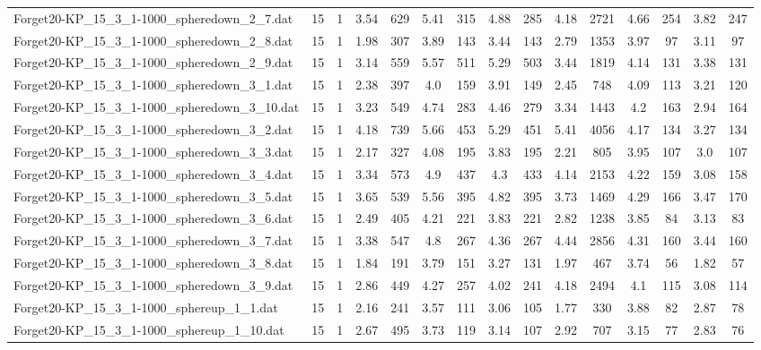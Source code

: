 \begin{table}[!ht]
{\begin{tabular}{lcccccccccccccc}
Forget20-KP\_15\_3\_1-1000\_spheredown\_2\_7.dat & 15 & 1 & 3.54 & 629 & 5.41 & 315 & 4.88 & 285 & 4.18 & 2721 & 4.66 & 254 & 3.82 & 247 \\
Forget20-KP\_15\_3\_1-1000\_spheredown\_2\_8.dat & 15 & 1 & 1.98 & 307 & 3.89 & 143 & 3.44 & 143 & 2.79 & 1353 & 3.97 & 97 & 3.11 & 97 \\
Forget20-KP\_15\_3\_1-1000\_spheredown\_2\_9.dat & 15 & 1 & 3.14 & 559 & 5.57 & 511 & 5.29 & 503 & 3.44 & 1819 & 4.14 & 131 & 3.38 & 131 \\
Forget20-KP\_15\_3\_1-1000\_spheredown\_3\_1.dat & 15 & 1 & 2.38 & 397 & 4.0 & 159 & 3.91 & 149 & 2.45 & 748 & 4.09 & 113 & 3.21 & 120 \\
Forget20-KP\_15\_3\_1-1000\_spheredown\_3\_10.dat & 15 & 1 & 3.23 & 549 & 4.74 & 283 & 4.46 & 279 & 3.34 & 1443 & 4.2 & 163 & 2.94 & 164 \\
Forget20-KP\_15\_3\_1-1000\_spheredown\_3\_2.dat & 15 & 1 & 4.18 & 739 & 5.66 & 453 & 5.29 & 451 & 5.41 & 4056 & 4.17 & 134 & 3.27 & 134 \\
Forget20-KP\_15\_3\_1-1000\_spheredown\_3\_3.dat & 15 & 1 & 2.17 & 327 & 4.08 & 195 & 3.83 & 195 & 2.21 & 805 & 3.95 & 107 & 3.0 & 107 \\
Forget20-KP\_15\_3\_1-1000\_spheredown\_3\_4.dat & 15 & 1 & 3.34 & 573 & 4.9 & 437 & 4.3 & 433 & 4.14 & 2153 & 4.22 & 159 & 3.08 & 158 \\
Forget20-KP\_15\_3\_1-1000\_spheredown\_3\_5.dat & 15 & 1 & 3.65 & 539 & 5.56 & 395 & 4.82 & 395 & 3.73 & 1469 & 4.29 & 166 & 3.47 & 170 \\
Forget20-KP\_15\_3\_1-1000\_spheredown\_3\_6.dat & 15 & 1 & 2.49 & 405 & 4.21 & 221 & 3.83 & 221 & 2.82 & 1238 & 3.85 & 84 & 3.13 & 83 \\
Forget20-KP\_15\_3\_1-1000\_spheredown\_3\_7.dat & 15 & 1 & 3.38 & 547 & 4.8 & 267 & 4.36 & 267 & 4.44 & 2856 & 4.31 & 160 & 3.44 & 160 \\
Forget20-KP\_15\_3\_1-1000\_spheredown\_3\_8.dat & 15 & 1 & 1.84 & 191 & 3.79 & 151 & 3.27 & 131 & 1.97 & 467 & 3.74 & 56 & 1.82 & 57 \\
Forget20-KP\_15\_3\_1-1000\_spheredown\_3\_9.dat & 15 & 1 & 2.86 & 449 & 4.27 & 257 & 4.02 & 241 & 4.18 & 2494 & 4.1 & 115 & 3.08 & 114 \\
Forget20-KP\_15\_3\_1-1000\_sphereup\_1\_1.dat & 15 & 1 & 2.16 & 241 & 3.57 & 111 & 3.06 & 105 & 1.77 & 330 & 3.88 & 82 & 2.87 & 78 \\
Forget20-KP\_15\_3\_1-1000\_sphereup\_1\_10.dat & 15 & 1 & 2.67 & 495 & 3.73 & 119 & 3.14 & 107 & 2.92 & 707 & 3.15 & 77 & 2.83 & 76 \\

\end{tabular}}
\end{table}
